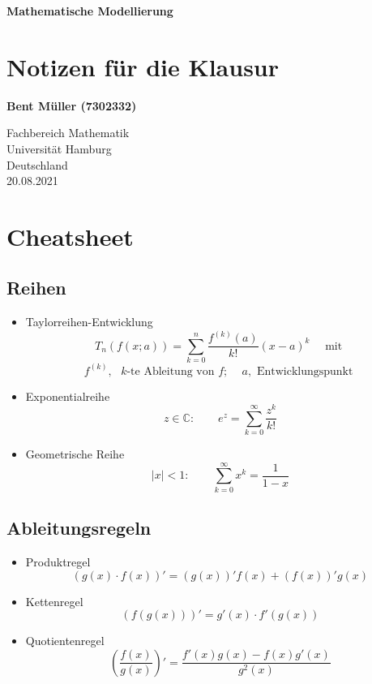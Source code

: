 \documentclass[a4paper]{article}
\begin{document}
\begin{titlepage}
	\begin{center}
		\vspace*{1cm}

		\textbf{Mathematische Modellierung}

		\vspace{0.5cm}
		\section*{
			Notizen für die Klausur
		}

		\vspace{1.5cm}

		\textbf{Bent Müller (7302332)}

		\vfill

		\vspace{0.8cm}


		Fachbereich Mathematik\\
		Universität Hamburg\\
		Deutschland\\
		20.08.2021

	\end{center}
\end{titlepage}

\pagebreak
\tableofcontents
\pagebreak

\section{Cheatsheet}

\subsection{Reihen}

\begin{itemize}
	\item Taylorreihen-Entwicklung
	\[
		T_{n} ( f(x; a) ) = 
		\sum_{k=0}^{n} \frac{ f ^{(k)} (a) }{ k! } (x - a) ^{k}
		\quad \text{ mit }
	\] 
	\[
		f ^{(k)},
		\text{ $k$-te Ableitung von $f$; } \quad
		a,
		\text{ Entwicklungspunkt }
	\] 
	\item Exponentialreihe
	\[
		z \in \mathbb{C}: \qquad
		e ^{z} = \sum_{k=0}^{\infty} \frac{ z ^{k} }{ k! }
	\] 
	\item Geometrische Reihe
		\[
		| x | < 1: \qquad
		\sum_{k=0}^{\infty} x ^{k} = \frac{ 1 }{ 1 - x }
		\] 
\end{itemize}

\subsection{Ableitungsregeln}
\begin{itemize}
	\item Produktregel
		\[
			(g(x) \cdot f(x))' = 
			(g(x))' f(x) +
			(f(x))' g(x)
		\] 
	\item Kettenregel
		\[
		(f(g(x)))' =
		g' (x) \cdot f' (g(x))
		\] 
	\item Quotientenregel
	\[
		\left(
			\frac{ f(x) }{ g(x) }
		\right) '
		=
		\frac{ f' (x) g(x) - f(x) g' (x) }{ g ^2 (x) }
	\] 
\end{itemize}
\end{document}
